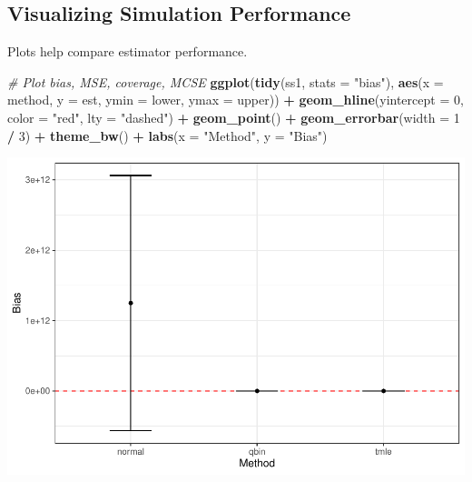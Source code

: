 \documentclass[
]{article}
\newenvironment{Shaded}{\begin{snugshade}}{\end{snugshade}}
\newcommand{\AttributeTok}[1]{\textcolor[rgb]{0.13,0.29,0.53}{#1}}
\newcommand{\CommentTok}[1]{\textcolor[rgb]{0.56,0.35,0.01}{\textit{#1}}}
\newcommand{\DecValTok}[1]{\textcolor[rgb]{0.00,0.00,0.81}{#1}}
\newcommand{\FunctionTok}[1]{\textcolor[rgb]{0.13,0.29,0.53}{\textbf{#1}}}
\newcommand{\NormalTok}[1]{#1}
\newcommand{\SpecialCharTok}[1]{\textcolor[rgb]{0.81,0.36,0.00}{\textbf{#1}}}
\newcommand{\StringTok}[1]{\textcolor[rgb]{0.31,0.60,0.02}{#1}}
\begin{document}
\subsection{Visualizing Simulation
Performance}\label{visualizing-simulation-performance}

Plots help compare estimator performance.

\begin{Shaded}
\begin{Highlighting}[]
\CommentTok{\# Plot bias, MSE, coverage, MCSE}
\FunctionTok{ggplot}\NormalTok{(}\FunctionTok{tidy}\NormalTok{(ss1, }\AttributeTok{stats =} \StringTok{"bias"}\NormalTok{), }\FunctionTok{aes}\NormalTok{(}\AttributeTok{x =}\NormalTok{ method, }\AttributeTok{y =}\NormalTok{ est, }\AttributeTok{ymin =}\NormalTok{ lower, }\AttributeTok{ymax =}\NormalTok{ upper)) }\SpecialCharTok{+}
  \FunctionTok{geom\_hline}\NormalTok{(}\AttributeTok{yintercept =} \DecValTok{0}\NormalTok{, }\AttributeTok{color =} \StringTok{"red"}\NormalTok{, }\AttributeTok{lty =} \StringTok{"dashed"}\NormalTok{) }\SpecialCharTok{+}
  \FunctionTok{geom\_point}\NormalTok{() }\SpecialCharTok{+}
  \FunctionTok{geom\_errorbar}\NormalTok{(}\AttributeTok{width =} \DecValTok{1} \SpecialCharTok{/} \DecValTok{3}\NormalTok{) }\SpecialCharTok{+}
  \FunctionTok{theme\_bw}\NormalTok{() }\SpecialCharTok{+}
  \FunctionTok{labs}\NormalTok{(}\AttributeTok{x =} \StringTok{"Method"}\NormalTok{, }\AttributeTok{y =} \StringTok{"Bias"}\NormalTok{)}
\end{Highlighting}
\end{Shaded}

\includegraphics{simulation_files/figure-latex/sim-results-1.pdf}
\end{document}
